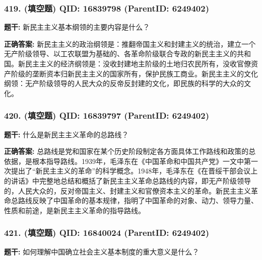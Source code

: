 \documentclass[12pt,UTF8]{ctexart}
\begin{document}
\vspace{0.3em}\hrulefill\vspace{0.7em}

\subsubsection*{419. (填空题) \small QID: 16839798 (ParentID: 6249402)}

\textbf{题干:}
新民主主义基本纲领的主要内容是什么？



\textbf{正确答案:}
新民主主义的政治纲领是：推翻帝国主义和封建主义的统治，建立一个无产阶级领导、以工农联盟为基础的、各革命阶级联合专政的新民主主义的共和国。新民主主义的经济纲领是：没收封建地主阶级的土地归农民所有，没收官僚资产阶级的垄断资本归新民主主义的国家所有，保护民族工商业。新民主主义的文化纲领：无产阶级领导的人民大众的反帝反封建的文化，即民族的科学的大众的文化。

\vspace{0.3em}\hrulefill\vspace{0.7em}

\subsubsection*{420. (填空题) \small QID: 16839797 (ParentID: 6249402)}

\textbf{题干:}
什么是新民主主义革命的总路线？



\textbf{正确答案:}
总路线是党和国家在某个历史阶段制定各方面具体工作路线和政策的总依据，是根本指导路线。1939年，毛泽东在《中国革命和中国共产党》一文中第一次提出了“新民主主义的革命”的科学概念。1948年，毛泽东在《在晋绥干部会议上的讲话》中完整地总结和概括了新民主主义革命总路线的内容，即无产阶级领导的，人民大众的，反对帝国主义、封建主义和官僚资本主义的革命。新民主主义革命总路线反映了中国革命的基本规律，指明了中国革命的对象、动力、领导力量、性质和前途，是新民主主义革命的指导路线。

\vspace{0.3em}\hrulefill\vspace{0.7em}

\subsubsection*{421. (填空题) \small QID: 16840024 (ParentID: 6249402)}

\textbf{题干:}
如何理解中国确立社会主义基本制度的重大意义是什么？
\end{document}
